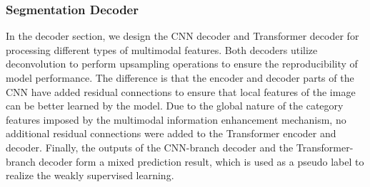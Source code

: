 \documentclass[sigconf,natbib=false]{acmart}
\begin{document}
\subsubsection{Segmentation Decoder}
In the decoder section, we design the CNN decoder and Transformer decoder for processing different types of multimodal features. Both decoders utilize deconvolution to perform upsampling operations to ensure the reproducibility of model performance. The difference is that the encoder and decoder parts of the CNN have added residual connections to ensure that local features of the image can be better learned by the model. Due to the global nature of the category features imposed by the multimodal information enhancement mechanism, no additional residual connections were added to the Transformer encoder and decoder. Finally, the outputs of the CNN-branch decoder and the Transformer-branch decoder form a mixed prediction result, which is used as a pseudo label to realize the weakly supervised learning.
\vspace{-2mm}
\end{document}
